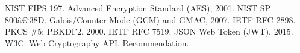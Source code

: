 ﻿%
\begin{thebibliography}{9}
   NIST FIPS 197. Advanced Encryption Standard (AES), 2001.
   NIST SP 800â€‘38D. Galois/Counter Mode (GCM) and GMAC, 2007.
   IETF RFC 2898. PKCS \#5: PBKDF2, 2000.
   IETF RFC 7519. JSON Web Token (JWT), 2015.
   W3C. Web Cryptography API, Recommendation.
\end{thebibliography}

